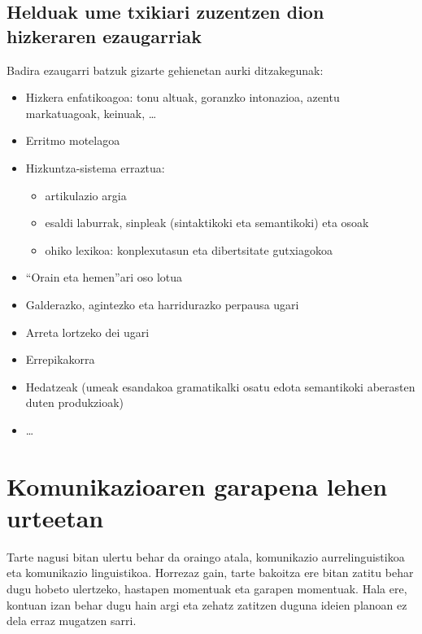 \documentclass[
]{book}
\providecommand{\tightlist}{%
  \setlength{\itemsep}{0pt}\setlength{\parskip}{0pt}}
\begin{document}
\hypertarget{helduak-ume-txikiari-zuzentzen-dion-hizkeraren-ezaugarriak}{%
\subsection{Helduak ume txikiari zuzentzen dion hizkeraren ezaugarriak}\label{helduak-ume-txikiari-zuzentzen-dion-hizkeraren-ezaugarriak}}

Badira ezaugarri batzuk gizarte gehienetan aurki ditzakegunak:

\begin{itemize}
\tightlist
\item
  Hizkera enfatikoagoa: tonu altuak, goranzko intonazioa, azentu markatuagoak, keinuak, \ldots{}
\item
  Erritmo motelagoa
\item
  Hizkuntza-sistema erraztua:

  \begin{itemize}
  \tightlist
  \item
    artikulazio argia
  \item
    esaldi laburrak, sinpleak (sintaktikoki eta semantikoki) eta osoak
  \item
    ohiko lexikoa: konplexutasun eta dibertsitate gutxiagokoa\\
  \end{itemize}
\item
  ``Orain eta hemen''ari oso lotua
\item
  Galderazko, agintezko eta harridurazko perpausa ugari
\item
  Arreta lortzeko dei ugari
\item
  Errepikakorra
\item
  Hedatzeak (umeak esandakoa gramatikalki osatu edota semantikoki aberasten duten produkzioak)
\item
  \ldots{}
\end{itemize}

\hypertarget{komunikazioaren-garapena-lehen-urteetan}{%
\section{Komunikazioaren garapena lehen urteetan}\label{komunikazioaren-garapena-lehen-urteetan}}

Tarte nagusi bitan ulertu behar da oraingo atala, komunikazio aurrelinguistikoa eta komunikazio linguistikoa. Horrezaz gain, tarte bakoitza ere bitan zatitu behar dugu hobeto ulertzeko, hastapen momentuak eta garapen momentuak. Hala ere, kontuan izan behar dugu hain argi eta zehatz zatitzen duguna ideien planoan ez dela erraz mugatzen sarri.
\end{document}
